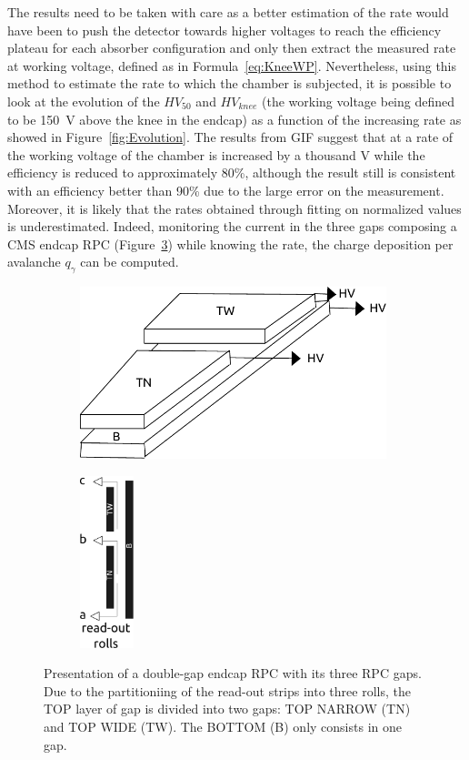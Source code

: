 	The results need to be taken with care as a better estimation of the rate would have been to push the detector towards higher voltages to reach the efficiency plateau for each absorber configuration and only then extract the measured rate at working voltage, defined as in Formula~\ref{eq:KneeWP}. Nevertheless, using this method to estimate the rate to which the chamber is subjected, it is possible to look at the evolution of the $HV_{50}$ and $HV_{knee}$ (the working voltage being defined to be \SI{150}{V} above the knee in the endcap) as a function of the increasing rate as showed in Figure~\ref{fig:Evolution}. The results from GIF suggest that at a rate of  the working voltage of the chamber is increased by a thousand \si{V} while the efficiency is reduced to approximately 80\%, although the result still is consistent with an efficiency better than 90\% due to the large error on the measurement. Moreover, it is likely that the rates obtained through fitting on normalized values is underestimated. Indeed, monitoring the current in the three gaps composing a CMS endcap RPC (Figure~\ref{fig:EndcapRPC}) while knowing the rate, the charge deposition per avalanche $q_\gamma$ can be computed.
	
	\begin{figure}[H]
    	\begin{subfigure}{0.69\linewidth}
			\centering
    		\includegraphics[height = 5cm]{fig/chapt5/Endcap-3D.pdf}
        	\caption{\label{fig:EndcapRPC:A}}
    	\end{subfigure}
    	\begin{subfigure}{0.29\linewidth}
			\centering
    		\includegraphics[height = 5cm]{fig/chapt5/Endcap-side.pdf}\\
        	\caption{\label{fig:EndcapRPC:B}}
    	\end{subfigure}
		\caption{\label{fig:EndcapRPC} Presentation of a double-gap endcap RPC with its three RPC gaps. Due to the partitioniing of the read-out strips into three rolls, the TOP layer of gap is divided into two gaps: TOP NARROW (TN) and TOP WIDE (TW). The BOTTOM (B) only consists in one gap.}
	\end{figure}
	
